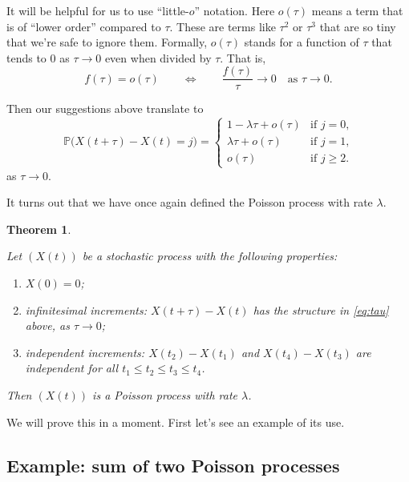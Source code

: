 \documentclass[
  a4paper,
]{article}
\providecommand{\tightlist}{%
  \setlength{\itemsep}{0pt}\setlength{\parskip}{0pt}}
\newtheorem{theorem}{Theorem}[section]
\theoremstyle{definition}
\theoremstyle{definition}
\theoremstyle{definition}
\theoremstyle{remark}
\begin{document}
It will be helpful for us to use ``little-\(o\)'' notation. Here \(o(\tau)\) means a term that is of ``lower order'' compared to \(\tau\). These are terms like \(\tau^2\) or \(\tau^3\) that are so tiny that we're safe to ignore them. Formally, \(o(\tau)\) stands for a function of \(\tau\) that tends to \(0\) as \(\tau \to 0\) even when divided by \(\tau\). That is,
\[ f(\tau) = o(\tau) \qquad \iff \qquad \frac{f(\tau)}{\tau} \to 0 \quad \text{as $\tau \to 0$.}  \]

Then our suggestions above translate to
\begin{equation} \mathbb P \big(X(t+\tau) - X(t) = j\big) = \begin{cases} 1 - \lambda \tau + o(\tau) & \text{if $j = 0$,} \\
\lambda\tau + o(\tau) & \text{if $j = 1$,} \\
o(\tau) & \text{if $j \geq 2$.} \end{cases} \label{eq:tau} \end{equation}
as \(\tau \to 0\).

It turns out that we have once again defined the Poisson process with rate \(\lambda\).

\begin{theorem}
\protect\hypertarget{thm:def-inf}{}\label{thm:def-inf}

Let \((X(t))\) be a stochastic process with the following properties:

\begin{enumerate}
\def\labelenumi{\arabic{enumi}.}
\tightlist
\item
  \(X(0) = 0\);
\item
  infinitesimal increments: \(X(t+\tau) - X(t)\) has the structure in \eqref{eq:tau} above, as \(\tau \to 0\);
\item
  independent increments: \(X(t_2) - X(t_1)\) and \(X(t_4) - X(t_3)\) are independent for all \(t_1 \leq t_2 \leq t_3 \leq t_4\).
\end{enumerate}

Then \((X(t))\) is a Poisson process with rate \(\lambda\).

\end{theorem}

We will prove this in a moment. First let's see an example of its use.

\hypertarget{sum2}{%
\subsection{Example: sum of two Poisson processes}\label{sum2}}
\end{document}
